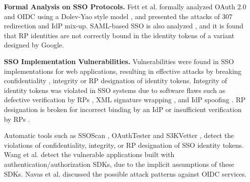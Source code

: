 \noindent\textbf{Formal Analysis on SSO Protocols.}
Fett et al. \cite{FettKS16, FettKS17} formally analyzed OAuth 2.0 and OIDC using a Dolev-Yao style model \cite{FettKS14},
    and presented the attacks of 307 redirection and IdP mix-up.
SAML-based SSO is also analyzed \cite{ArmandoCCCT08},
    and it is found that RP identities are not correctly bound in the identity tokens of a variant designed by Google.



\noindent\textbf{SSO Implementation Vulnerabilities.}
Vulnerabilities were found in SSO implementations for web applications,
    resulting in effective attacks %
     by breaking confidentiality \cite{WangCW12,ccsSunB12,ArmandoCCCPS13,DiscoveringJCS,dimvaLiM16}, integrity \cite{WangCW12,SomorovskyMSKJ12,WangZLG16,MainkaMS16, MainkaMSW17,dimvaLiM16} or RP designation \cite{WangZLG16,MainkaMS16,MainkaMSW17,YangLCZ18,dimvaLiM16} of identity tokens.
Integrity of identity tokens was violated in SSO systems  %
due to software flaws such as
 defective verification by RPs \cite{WangCW12,WangZLG16,MainkaMSW17}, XML signature wrapping \cite{SomorovskyMSKJ12}, and IdP spoofing \cite{MainkaMS16,MainkaMSW17}.
RP designation is broken
    for incorrect binding by an IdP \cite{YangLCZ18,WangZLG16} or insufficient verification by RPs \cite{MainkaMS16,MainkaMSW17,YangLCZ18}.

Automatic tools such as SSOScan \cite{ZhouE14}, OAuthTester \cite{YangLLZH16} and S3KVetter \cite{YangLCZ18},
detect the violations of confidentiality, integrity, or RP designation of SSO identity tokens.
Wang et al. \cite{ExplicatingSDK} detect the vulnerable applications
    built with authentication/authorization SDKs,
     due to the implicit assumptions of these SDKs.
Navas et al. \cite{NavasB19} discussed the possible attack patterns against OIDC services.

